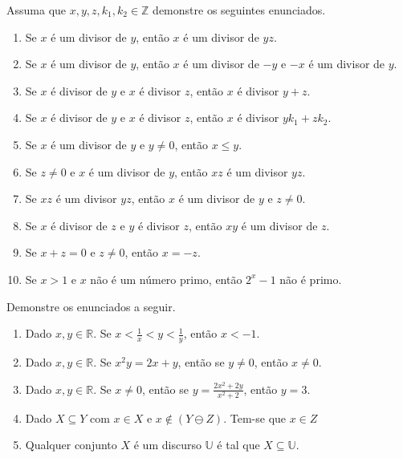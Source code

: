 \begin{exercise}\label{exerc:Demonstracao2}
	Assuma que $x, y, z, k_1, k_2 \in \mathbb{Z}$ demonstre os seguintes enunciados.
\end{exercise}

\begin{enumerate}
	\item Se $x$ é um divisor de $y$, então $x$ é um divisor de $yz$.  
	\item Se $x$ é um divisor de $y$, então $x$ é um divisor de $-y$ e $-x$ é um divisor de $y$.
	\item Se $x$ é divisor de $y$ e $x$ é divisor $z$, então $x$ é divisor $y + z$.
	\item Se $x$ é divisor de $y$ e $x$ é divisor $z$, então $x$ é divisor $yk_1 + zk_2$.
	\item Se $x$ é um divisor de $y$ e $y \neq 0$, então $x \leq y$. 
	\item Se $z \neq 0$ e $x$ é um divisor de $y$, então $xz$ é um divisor $yz$.
	\item Se $xz$ é um divisor $yz$, então $x$ é um divisor de $y$ e $z \neq 0$.
	\item Se $x$ é divisor de $z$ e $y$ é divisor $z$, então $xy$ é um divisor de $z$.
	\item Se $x + z = 0$ e $z \neq 0$, então $x = -z$. 
	\item Se $x > 1$ e $x$ não é um número primo,  então $2^x - 1$ não é primo.
\end{enumerate}

\begin{exercise}\label{exerc:Demonstracao3}
	Demonstre os enunciados a seguir.
\end{exercise}

\begin{enumerate}
	\item Dado $x, y \in \mathbb{R}$. Se $\displaystyle x < \frac{1}{x} < y < \frac{1}{y}$, então $x < -1$.
	\item Dado $x, y \in \mathbb{R}$. Se $x^2y = 2x + y$, então se $y \neq 0$, então $x \neq 0$.
	\item Dado $x, y \in \mathbb{R}$. Se $x \neq 0$, então se $\displaystyle y = \frac{2x^2+2y}{x^2+2}$, então $y = 3$.
	\item Dado $X \subseteq Y$ com $x \in X$ e $x \notin (Y \ominus Z)$. Tem-se que $x \in Z$ 
	\item Qualquer conjunto $X$ é um discurso $\mathbb{U}$ é tal que $X \subseteq \mathbb{U}$.
\end{enumerate}

